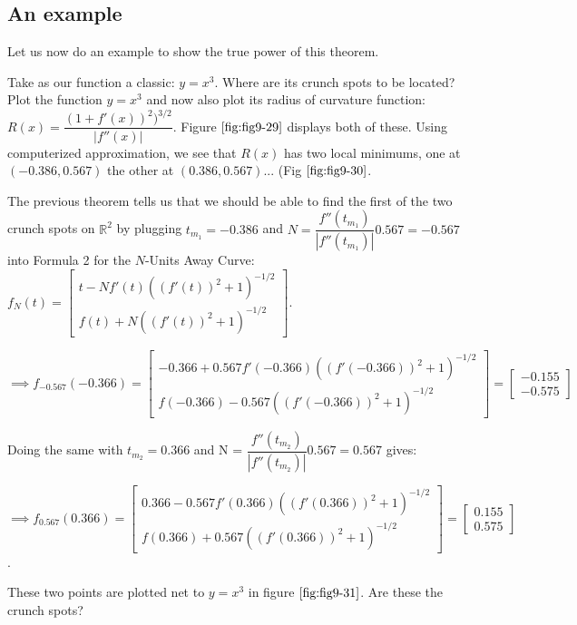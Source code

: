 \subsection{An example}

Let us now do an example to show the true power of this theorem.

Take as our function a classic: $y = x^3$. Where are its crunch spots to be located? Plot the function $y = x^3$ and now also plot its radius of curvature function: $R(x) = \dfrac{(1 + f'(x))^2)^{3/2}}{|f''(x)|}$. Figure $\ref{fig:fig9-29}$ displays both of these. Using computerized approximation, we see that $R(x)$ has two local minimums, one at $(-0.386, 0.567)$ the other at $(0.386, 0.567)$... (Fig $\ref{fig:fig9-30}$.

The previous theorem tells us that we should be able to find the first of the two crunch spots on $\mathbb{R}^2$ by plugging $t_{m_1} = -0.386$ and $N = \dfrac{f''(t_{m_1})}{|f''(t_{m_1})|} 0.567 = -0.567$ into Formula 2 for the $N$-Units Away Curve: $ f_N(t) = \begin{bmatrix} t - N f'(t) ((f'(t))^2 + 1)^{-1/2} \\ f(t) + N ((f'(t))^2 + 1)^{-1/2} \end{bmatrix} $.

$$\implies f_{-0.567}(-0.366) = \begin{bmatrix}
-0.366 + 0.567 f'(-0.366) ((f'(-0.366))^2 + 1)^{-1/2} \\ f(-0.366) -0.567 ((f'(-0.366))^2 + 1)^{-1/2}
\end{bmatrix} = \begin{bmatrix} -0.155 \\ -0.575 \end{bmatrix}$$

Doing the same with $t_{m_2} = 0.366$ and N = $\dfrac{f''(t_{m_2})}{|f''(t_{m_2})|} 0.567 = 0.567$ gives:

$$\implies f_{0.567}(0.366) = \begin{bmatrix}0.366 - 0.567 f'(0.366) ((f'(0.366))^2 + 1)^{-1/2} \\ f(0.366) + 0.567 ((f'(0.366))^2 + 1)^{-1/2}
\end{bmatrix} = \begin{bmatrix} 0.155 \\ 0.575 \end{bmatrix}$$.

These two points are plotted net to $y = x^3$ in figure $\ref{fig:fig9-31}$. Are these the crunch spots?

